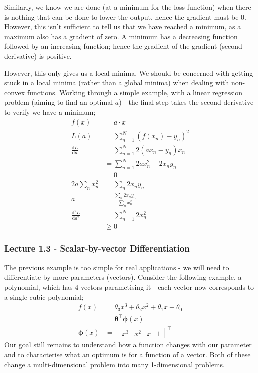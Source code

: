 \documentclass[a4paper, 12pt]{article}
\newcommand{\dif}[2]{\frac{\mathrm{d}#1}{\mathrm{d}#2}}
\newcommand{\summation}[2]{\sum\limits_{#1}^{#2}}
\renewcommand{\vec}[1]{\boldsymbol{#1}}
\begin{document}
            Similarly, we know we are done (at a minimum for the loss function) when there is nothing that can be done to lower the output, hence the gradient must be 0.
            However, this isn't sufficient to tell us that we have reached a minimum, as a maximum also has a gradient of zero.
            A minimum has a decreasing function followed by an increasing function; hence the gradient of the gradient (second derivative) is positive.
            \medskip

            However, this only gives us a local minima.
            We should be concerned with getting stuck in a local minima (rather than a global minima) when dealing with non-convex functions.
            Working through a simple example, with a linear regression problem (aiming to find an optimal $a$) - the final step takes the second derivative to verify we have a minimum;
            \begin{align*}
                f(x) & = a \cdot x \\
                L(a) & = \summation{n = 1}{N} (f(x_n) - y_n)^2 \\
                \dif{L}{a} & = \summation{n = 1}{N} 2(ax_n - y_n)x_n \\
                & = \summation{n = 1}{N} 2ax_n^2 - 2x_ny_n \\
                & = 0 \\
                2a\summation{n}{} x_n^2 & = \summation{n}{} 2x_ny_n \\
                a & = \frac{\summation{n}{} 2x_ny_n}{\summation{n}{} x_n^2} \\
                \dif{^2L}{a^2} & = \summation{n = 1}{N} 2x_n^2 \\
                & \geq 0
            \end{align*}
        \subsubsection*{Lecture 1.3 - Scalar-by-vector Differentiation}
            The previous example is too simple for real applications - we will need to differentiate by more parameters (vectors).
            Consider the following example, a polynomial, which has 4 vectors parametising it - each vector now corresponds to a single cubic polynomial;
            \begin{align*}
                f(x) & = \theta_3x^3 + \theta_2x^2 + \theta_1x + \theta_0 \\
                & = \vec{\theta}^\top\vec{\phi}(x) \\
                \vec{\phi}(x) & = \begin{bmatrix}
                    x^3 & x^2 & x & 1
                \end{bmatrix}^\top
            \end{align*}
            Our goal still remains to understand how a function changes with our parameter and to characterise what an optimum is for a function of a vector.
            Both of these change a multi-dimensional problem into many 1-dimensional problems.
            \medskip
\end{document}
